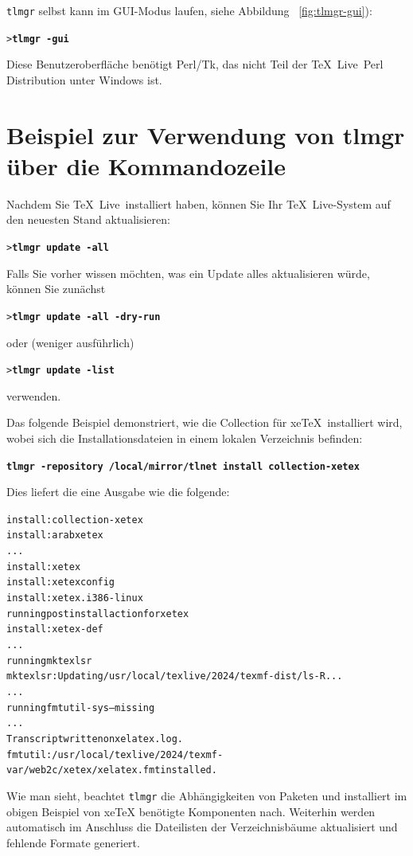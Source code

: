 \documentclass[12pt,ngerman,a4paper,fullparskip]{report}
\newcommand{\TL}{\TeX\ Live\xspace}
\newcommand{\prog}[1]{\texttt{#1}}
\newcommand{\Ucom}[1]{\textbf{\texttt{#1}}}
\providecommand*{\XeTeX}{xe\TeX\xspace}
\begin{document}
\prog{tlmgr} selbst kann im GUI-Modus laufen, siehe Abbildung
~\ref{fig:tlmgr-gui}):

\begin{alltt}
> \Ucom{tlmgr -gui}
\end{alltt}

Diese Benutzeroberfläche benötigt Perl/Tk, das nicht Teil der \TL\ Perl Distribution unter Windows ist.

\section{Beispiel zur Verwendung von tlmgr über die Kommandozeile}


Nachdem Sie \TL\ installiert haben, können Sie Ihr \TL-System auf den
neuesten Stand aktualisieren:
\begin{alltt}
> \Ucom{tlmgr update -all}
\end{alltt}
Falls Sie vorher wissen möchten, was ein Update alles aktualisieren würde, können Sie zunächst
\begin{alltt}
> \Ucom{tlmgr update -all -dry-run}
\end{alltt}
oder (weniger ausführlich)
\begin{alltt}
> \Ucom{tlmgr update -list}
\end{alltt}
verwenden.

Das folgende Beispiel demonstriert, wie die Collection für \XeTeX\ installiert
wird, wobei sich die Installationsdateien in einem lokalen Verzeichnis
befinden:
 
\begin{alltt}
\Ucom{tlmgr -repository /local/mirror/tlnet install collection-xetex}
\end{alltt}
Dies liefert die eine  Ausgabe wie die folgende:

\begin{alltt}\small
install: collection-xetex
install: arabxetex
...
install: xetex
install: xetexconfig
install: xetex.i386-linux
running post install action for xetex
install: xetex-def
...
running mktexlsr
mktexlsr: Updating /usr/local/texlive/2024/texmf-dist/ls-R...
...
running fmtutil-sys --missing
...
Transcript written on xelatex.log.
fmtutil: /usr/local/texlive/2024/texmf-var/web2c/xetex/xelatex.fmt installed.
\end{alltt}

Wie man sieht, beachtet \prog{tlmgr} die Abhängigkeiten von Paketen und installiert im obigen Beispiel von \XeTeX{} benötigte Komponenten nach. Weiterhin werden automatisch im Anschluss die Dateilisten der Verzeichnisbäume aktualisiert und fehlende Formate generiert.
\end{document}
